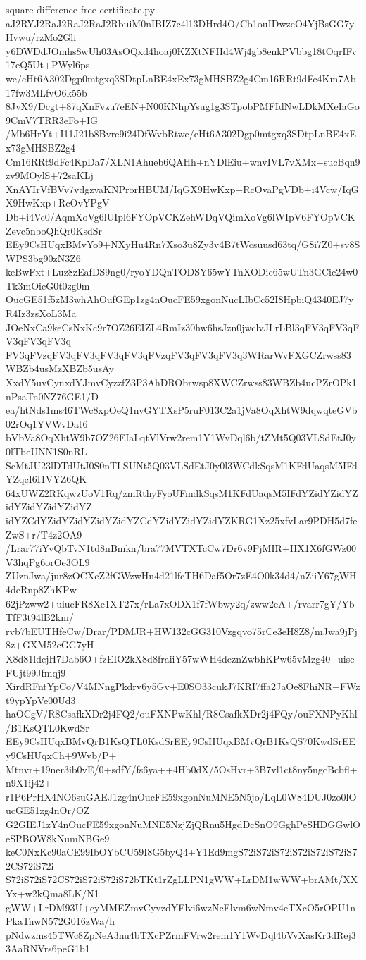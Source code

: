\documentclass[11pt]{article}
\theoremstyle{definition}
\theoremstyle{remark}
\begin{document}
\begin{filecontents*}[overwrite]{square-difference-free-certificate.py}
aJ2RYJ2RaJ2RaJ2RaJ2RbuiM0nIBIZ7c4l13DHrd4O/Cb1ouIDwzeO4YjBsGG7yHvwu/rzMo2Gli
y6DWDdJOmhs8wUh03AsOQxd4hoaj0KZXtNFHd4Wj4gb8enkPVbbg18tOqrIFv17eQ5Ut+PWyl6ps
we/eHt6A302Dgp0mtgxq3SDtpLnBE4xEx73gMHSBZ2g4Cm16RRt9dFc4Km7Ab17fw3MLfvO6k55b
8JvX9/Dcgt+87qXnFvzu7eEN+N00KNhpYsug1g3STpobPMFIdNwLDkMXeIaGo9CmV7TRR3eFo+IG
/Mb6HrYt+I11J21b8Bvre9i24DfWvbRtwe/eHt6A302Dgp0mtgxq3SDtpLnBE4xEx73gMHSBZ2g4
Cm16RRt9dFc4KpDa7/XLN1Ahueb6QAHh+nYDlEiu+wnvIVL7vXMx+sucBqn9zv9MOylS+72saKLj
XnAYIrVfBVv7vdgzvaKNProrHBUM/IqGX9HwKxp+RcOvaPgVDb+i4Vcw/IqGX9HwKxp+RcOvYPgV
Db+i4Vc0/AqmXoVg6lUIpl6FYOpVCKZehWDqVQimXoVg6lWIpV6FYOpVCKZevc5nboQhQr0KsdSr
EEy9CsHUqxBMvYo9+NXyHu4Rn7Xso3u8Zy3v4B7tWcsuusd63tq/G8i7Z0+sv8SWPS3bg90zN3Z6
keBwFxt+Luz8zEafDS9ng0/ryoYDQnTODSY65wYTnXODic65wUTn3GCic24w0Tk3mOicG0t0zg0m
OucGE51f5zM3whAhOufGEp1zg4nOucFE59xgonNucLIbCc52I8HpbiQ4340EJ7yR4Iz3zsXoL3Ma
JOeNxCa9keCsNxKc9r7OZ26EIZL4RmIz30hw6hsJzn0jwclvJLrLBl3qFV3qFV3qFV3qFV3qFV3q
FV3qFVzqFV3qFV3qFV3qFV3qFVzqFV3qFV3qFV3q3WRarWvFXGCZrwss83WBZb4usMzXBZb5usAy
XxdY5uvCynxdYJmvCyzzfZ3P3AhDRObrwsp8XWCZrwss83WBZb4ucPZrOPk1nPsaTn0NZ76GE1/D
ea/htNds1ms46TWc8xpOeQ1nvGYTXsP5ruF013C2a1jVa8OqXhtW9dqwqteGVb02rOq1YVWvDat6
bVbVa8OqXhtW9b7OZ26EIaLqtVlVrw2rem1Y1WvDql6b/tZMt5Q03VLSdEtJ0y0lTbeUNN1S0nRL
ScMtJU23lDTdUtJ0S0nTLSUNt5Q03VLSdEtJ0y0l3WCdkSqsM1KFdUaqsM5IFdYZqcI6I1VYZ6QK
64xUWZ2RKqwzUoV1Rq/zmRthyFyoUFmdkSqsM1KFdUaqsM5IFdYZidYZidYZidYZidYZidYZidYZ
idYZCdYZidYZidYZidYZidYZCdYZidYZidYZidYZKRG1Xz25xfvLar9PDH5d7feZwS+r/T4z2OA9
/Lrar77iYvQbTvN1td8nBmkn/bra77MVTXTcCw7Dr6v9PjMIR+HX1X6fGWz00V3hqPg6orOe3OL9
ZUznJwa/jur8zOCXcZ2fGWzwHn4d21lfcTH6Daf5Or7zE4O0k34d4/nZiiY67gWH4deRnp8ZhKPw
62jPzww2+uiucFR8Xe1XT27x/rLa7xODX1f7fWbwy2q/zww2eA+/rvarr7gY/YbTfF3t94lB2km/
rvb7bEUTHfeCw/Drar/PDMJR+HW132cGG310Vzgqvo75rCe3eH8Z8/mJwa9jPj8z+GXM52cGG7yH
X8d81ldcjH7Dab6O+fzEIO2kX8d8fraiiY57wWH4dcznZwbhKPw65vMzg40+uiscFUjt99Jfmqj9
XirdRFntYpCo/V4MNngPkdrv6y5Gv+E0SO33cukJ7KRI7ffa2JaOe8FhiNR+FWzt9ypYpVe00Ud3
haOCgV/R8CsafkXDr2j4FQ2/ouFXNPwKhl/R8CsafkXDr2j4FQy/ouFXNPyKhl/B1KsQTL0KwdSr
EEy9CsHUqxBMvQrB1KsQTL0KsdSrEEy9CsHUqxBMvQrB1KsQS70KwdSrEEy9CsHUqxCh+9Wvb/P+
Mtnvr+19ner3ib0vE/0+sdfY/fs6ya++4Hb0dX/5OsHvr+3B7vl1ct8ny5ngcBcbfl+n9X1ij42+
r1P6PrHX4NO6suGAEJ1zg4nOucFE59xgonNuMNE5N5jo/LqL0W84DUJ0zo0lOucGE51zg4nOr/OZ
G2GIEJ1zY4nOucFE59xgonNuMNE5NzjZjQRnu5HgdDcSnO9GghPeSHDGGwlOeSPBOW8kNumNBGe9
keC0NxKc90aCE99IbOYbCU59I8G5byQ4+Y1Ed9mgS72iS72iS72iS72iS72iS72iS72CS72iS72i
S72iS72iS72CS72iS72iS72iS72bTKt1rZgLLPN1gWW+LrDM1wWW+brAMt/XXYx+w2kQma8LK/N1
gWW+LrDM93U+cyMMEZmvCyvzdYFlvi6wzNcFlvm6wNmv4eTXcO5rOPU1nPkaTnwN572G016zWa/h
pNdwzms45TWc8ZpNeA3nu4bTXcPZrmFVrw2rem1Y1WvDql4bVvXasKr3dRej33AaRNVrs6peG1b1

\end{filecontents*}
\end{document}

